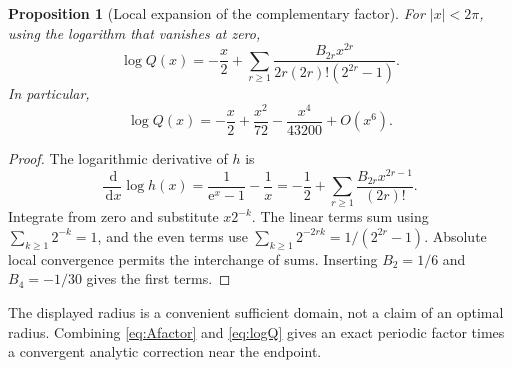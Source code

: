 \documentclass[11pt,oneside]{article}
\numberwithin{equation}{section}
\newtheorem{proposition}[theorem]{Proposition}
\theoremstyle{definition}
\theoremstyle{remark}
\newcommand{\dd}{\,\mathrm d}
\newcommand{\e}{\mathrm e}
\begin{document}
\begin{proposition}[Local expansion of the complementary factor]
For \(|x|<2\pi\), using the logarithm that vanishes at zero,
\begin{equation}
 \log Q(x)=-\frac x2+
 \sum_{r\ge1}\frac{B_{2r}x^{2r}}
 {2r(2r)!(2^{2r}-1)}.
 \label{eq:logQ}
\end{equation}
In particular,
\begin{equation}
 \log Q(x)=-\frac x2+\frac{x^2}{72}-\frac{x^4}{43200}+O(x^6).
 \label{eq:logQfirst}
\end{equation}
\end{proposition}
\begin{proof}
The logarithmic derivative of \(h\) is
\[
 \frac{\dd}{\dd x}\log h(x)=\frac1{\e^x-1}-\frac1x
 =-\frac12+\sum_{r\ge1}\frac{B_{2r}x^{2r-1}}{(2r)!}.
\]
Integrate from zero and substitute \(x2^{-k}\). The linear terms sum using
\(\sum_{k\ge1}2^{-k}=1\), and the even terms use
\(\sum_{k\ge1}2^{-2rk}=1/(2^{2r}-1)\). Absolute local convergence permits
the interchange of sums. Inserting \(B_2=1/6\) and \(B_4=-1/30\) gives the
first terms.
\end{proof}

The displayed radius is a convenient sufficient domain, not a claim of an
optimal radius. Combining \eqref{eq:Afactor} and \eqref{eq:logQ} gives an exact
periodic factor times a convergent analytic correction near the endpoint.
\end{document}
